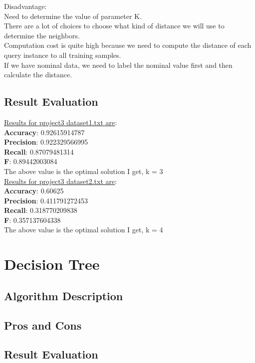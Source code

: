 \documentclass[paper=letter, fontsize=11pt]{article}
\numberwithin{equation}{section}		%
\numberwithin{figure}{section}			%
\numberwithin{table}{section}				%
\begin{document}
\noindent Disadvantage:\\
Need to determine the value of parameter K.\\
There are a lot of choices to choose what kind of distance we will use to determine the neighbors.\\
Computation cost is quite high because we need to compute the distance of each query instance to all training samples.\\
If we have nominal data, we need to label the nominal value first and then calculate the distance.\\
\subsection{Result Evaluation}
\noindent \underline{Results for project3 dataset1.txt are}: \\ 
\textbf{Accuracy}: 0.92615914787\\
\textbf{Precision}: 0.922329566995\\
\textbf{Recall}: 0.87079481314\\
\textbf{F}: 0.89442003084\\

\noindent The above value is the optimal solution I get, k = 3\\

\noindent \underline{Results for project3 dataset2.txt are}:\\
\textbf{Accuracy}: 0.60625\\
\textbf{Precision}: 0.411791272453\\
\textbf{Recall}: 0.318770209838\\
\textbf{F}: 0.357137604338\\

\noindent The above value is the optimal solution I get, k = 4
\section{Decision Tree}
\subsection{Algorithm Description}

\subsection{Pros and Cons}

\subsection{Result Evaluation}
\end{document}
